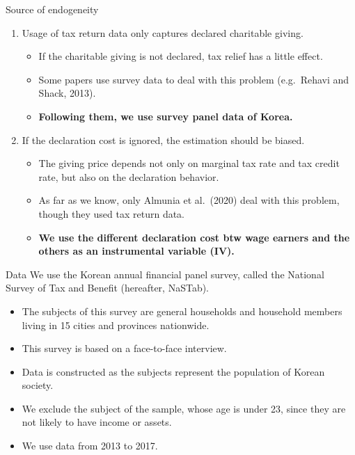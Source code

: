 \documentclass[dvipdfmx,10pt]{beamer}
\begin{document}
	\begin{frame}{Source of endogeneity}
		\begin{enumerate}
			\item Usage of tax return data only captures declared charitable giving.
			\begin{itemize}
				\item If the charitable giving is not declared, tax relief has a little effect.
				\item Some papers use survey data to deal with this problem (e.g.~Rehavi and Shack, 2013).
				\item \textbf{Following them, we use survey panel data of Korea.}
			\end{itemize}
			\item If the declaration cost is ignored, the estimation should be biased.
			\begin{itemize}
				\item The giving price depends not only on marginal tax rate and tax credit rate, but also on the declaration behavior.
				\item As far as we know, only Almunia et al.~(2020) deal with this problem, though they used tax return data.
				\item\textbf{We use the different declaration cost btw wage earners and the others as an instrumental variable (IV).}
			\end{itemize}
		\end{enumerate}
	\end{frame}
	
	\begin{frame}{Data}
		We use the Korean annual financial panel survey, called the National Survey of Tax and Benefit (hereafter, NaSTab).
		\begin{itemize}
			\item The subjects of this survey are general households and household members living in 15 cities and provinces nationwide.
			\item This survey is based on a face-to-face interview.
			\item Data is constructed as the subjects represent the population of Korean society.
			\item We exclude the subject of the sample, whose age is under 23, since they are not likely to have income or assets.
			\item We use data from 2013 to 2017.
		\end{itemize}
	\end{frame}
\end{document}
